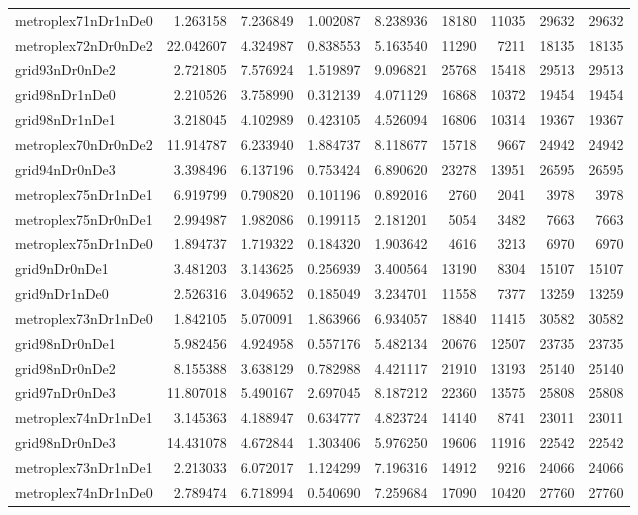 \begin{longtable}{|l|r|r|r|r|r|r|r|r|}
metroplex71nDr1nDe0 & 1.263158 & 7.236849 & 1.002087 & 8.238936 & 18180 & 11035 & 29632 & 29632 \\
metroplex72nDr0nDe2 & 22.042607 & 4.324987 & 0.838553 & 5.163540 & 11290 & 7211 & 18135 & 18135 \\
grid93nDr0nDe2 & 2.721805 & 7.576924 & 1.519897 & 9.096821 & 25768 & 15418 & 29513 & 29513 \\
grid98nDr1nDe0 & 2.210526 & 3.758990 & 0.312139 & 4.071129 & 16868 & 10372 & 19454 & 19454 \\
grid98nDr1nDe1 & 3.218045 & 4.102989 & 0.423105 & 4.526094 & 16806 & 10314 & 19367 & 19367 \\
metroplex70nDr0nDe2 & 11.914787 & 6.233940 & 1.884737 & 8.118677 & 15718 & 9667 & 24942 & 24942 \\
grid94nDr0nDe3 & 3.398496 & 6.137196 & 0.753424 & 6.890620 & 23278 & 13951 & 26595 & 26595 \\
metroplex75nDr1nDe1 & 6.919799 & 0.790820 & 0.101196 & 0.892016 & 2760 & 2041 & 3978 & 3978 \\
metroplex75nDr0nDe1 & 2.994987 & 1.982086 & 0.199115 & 2.181201 & 5054 & 3482 & 7663 & 7663 \\
metroplex75nDr1nDe0 & 1.894737 & 1.719322 & 0.184320 & 1.903642 & 4616 & 3213 & 6970 & 6970 \\
grid9nDr0nDe1 & 3.481203 & 3.143625 & 0.256939 & 3.400564 & 13190 & 8304 & 15107 & 15107 \\
grid9nDr1nDe0 & 2.526316 & 3.049652 & 0.185049 & 3.234701 & 11558 & 7377 & 13259 & 13259 \\
metroplex73nDr1nDe0 & 1.842105 & 5.070091 & 1.863966 & 6.934057 & 18840 & 11415 & 30582 & 30582 \\
grid98nDr0nDe1 & 5.982456 & 4.924958 & 0.557176 & 5.482134 & 20676 & 12507 & 23735 & 23735 \\
grid98nDr0nDe2 & 8.155388 & 3.638129 & 0.782988 & 4.421117 & 21910 & 13193 & 25140 & 25140 \\
grid97nDr0nDe3 & 11.807018 & 5.490167 & 2.697045 & 8.187212 & 22360 & 13575 & 25808 & 25808 \\
metroplex74nDr1nDe1 & 3.145363 & 4.188947 & 0.634777 & 4.823724 & 14140 & 8741 & 23011 & 23011 \\
grid98nDr0nDe3 & 14.431078 & 4.672844 & 1.303406 & 5.976250 & 19606 & 11916 & 22542 & 22542 \\
metroplex73nDr1nDe1 & 2.213033 & 6.072017 & 1.124299 & 7.196316 & 14912 & 9216 & 24066 & 24066 \\
metroplex74nDr1nDe0 & 2.789474 & 6.718994 & 0.540690 & 7.259684 & 17090 & 10420 & 27760 & 27760 \\

\end{longtable}
